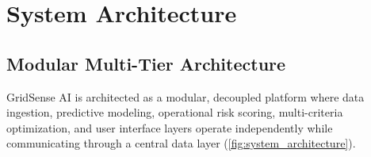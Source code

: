 \section{System Architecture}
\label{sec:system_architecture}

\subsection{Modular Multi-Tier Architecture}
\label{subsec:architecture_overview}

GridSense AI is architected as a modular, decoupled platform where data ingestion, predictive modeling, operational risk scoring, multi-criteria optimization, and user interface layers operate independently while communicating through a central data layer (\cref{fig:system_architecture}).

